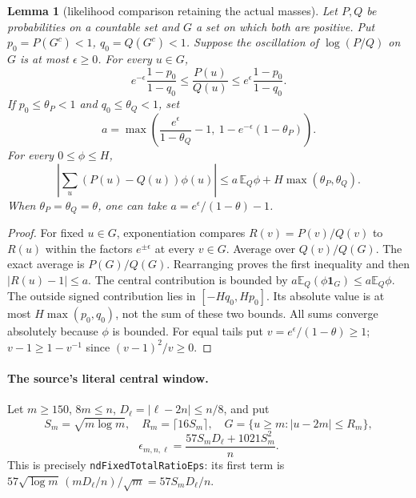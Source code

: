 \documentclass[11pt]{article}
\newtheorem{lemma}[proposition]{Lemma}
\theoremstyle{remark}\newtheorem{remark}[proposition]{Remark}
\begin{document}
\begin{lemma}[likelihood comparison retaining the actual masses]
\label{lem:mazur-exact-likelihood}
Let $P,Q$ be probabilities on a countable set and $G$ a set on which
both are positive. Put $p_0=P(G^c)<1$, $q_0=Q(G^c)<1$.
Suppose the oscillation of $\log(P/Q)$ on $G$ is at most $\epsilon\ge0$.
For every $u\in G$,
\begin{equation}
 e^{-\epsilon}\frac{1-p_0}{1-q_0}
 \le \frac{P(u)}{Q(u)}
 \le e^\epsilon\frac{1-p_0}{1-q_0}.
 \label{eq:mazur-exact-likelihood}
\end{equation}
If $p_0\le\theta_P<1$ and $q_0\le\theta_Q<1$, set
\[
 a=\max\left(\frac{e^\epsilon}{1-\theta_Q}-1,\
              1-e^{-\epsilon}(1-\theta_P)\right).
\]
For every $0\le\phi\le H$,
\begin{equation}
 \left|\sum_u(P(u)-Q(u))\phi(u)\right|
 \le a\,\mathbb E_Q\phi+H\max(\theta_P,\theta_Q).
 \label{eq:mazur-signed-tail}
\end{equation}
When $\theta_P=\theta_Q=\theta$, one can take
$a=e^\epsilon/(1-\theta)-1$.
\end{lemma}
\begin{proof}
For fixed $u\in G$, exponentiation compares $R(v)=P(v)/Q(v)$
to $R(u)$ within the factors $e^{\pm\epsilon}$ at every $v\in G$.
Average over $Q(v)/Q(G)$. The exact average is $P(G)/Q(G)$.
Rearranging proves the first inequality and then $|R(u)-1|\le a$.
The central contribution is bounded by
$a\mathbb E_Q(\phi\mathbf1_G)\le a\mathbb E_Q\phi$.
The outside signed contribution lies in $[-Hq_0,Hp_0]$.
Its absolute value is at most $H\max(p_0,q_0)$, not the sum
of these two bounds. All sums converge absolutely because $\phi$
is bounded. For equal tails put $v=e^\epsilon/(1-\theta)\ge1$;
$v-1\ge1-v^{-1}$ since $(v-1)^2/v\ge0$.
\end{proof}

\paragraph{The source's literal central window.}
Let $m\ge150$, $8m\le n$, $D_\ell=|\ell-2n|\le n/8$, and put
\[
 S_m=\sqrt{m\log m},\quad R_m=\lceil16S_m\rceil,\quad
 G=\{u\ge m:|u-2m|\le R_m\},
\]
\[
 \epsilon_{m,n,\ell}=\frac{57S_mD_\ell+1021S_m^2}{n}.
\]
This is precisely \texttt{ndFixedTotalRatioEps}: its first term is
$57\sqrt{\log m}\,(mD_\ell/n)/\sqrt m=57S_mD_\ell/n$.
\end{document}
